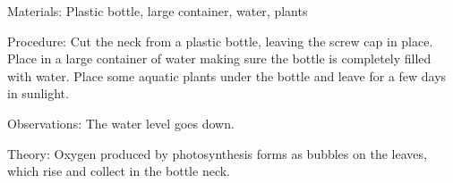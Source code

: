 \begin{multicols}{2}
\begin{description*}
\item[Materials:]{Plastic bottle, large container, water, plants}
\item[Procedure:]{Cut the neck from a plastic bottle, leaving the screw cap in place. Place in a large
container of water making sure the bottle is completely filled with water. Place some aquatic
plants under the bottle and leave for a few days in sunlight.}
\item[Observations:]{The water level goes down. }
\item[Theory:]{Oxygen produced by photosynthesis forms as bubbles on the
leaves, which rise and collect in the bottle neck.}
\end{description*}

%
%


\end{multicols}
